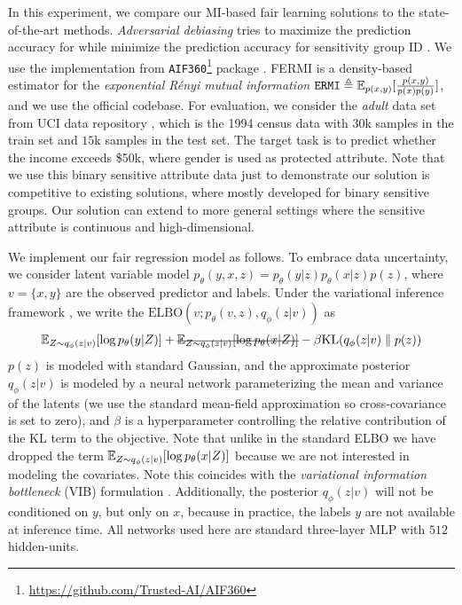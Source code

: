 \documentclass{article}
\theoremstyle{plain}
\theoremstyle{definition}
\theoremstyle{remark}
\newcommand{\ELBO}{\text{ELBO}}
\begin{document}
			In this experiment, we compare our MI-based fair learning solutions to the state-of-the-art methods. {\it Adversarial debiasing} tries to maximize the prediction accuracy for while minimize the prediction accuracy for sensitivity group ID \citep{zhang2018mitigating}. We use the implementation from \texttt{AIF360}\footnote{\url{https://github.com/Trusted-AI/AIF360}} package \citep{aif360-oct-2018}.  FERMI is a density-based estimator for the {\it exponential R\'enyi mutual information} $\texttt{ERMI}\triangleq \mathbb{E}_{p(x,y)}[\frac{p(x,y)}{p(x)p(y)}]$, and we use the official codebase. For evaluation, we consider the {\it adult} data set from UCI data repository \citep{asuncion2007uci}, which is the 1994 census data with $30$k samples in the train set and $15$k samples in the test set. The target task is to predict whether the income exceeds \$50k, where gender is used as protected attribute. Note that we use this binary sensitive attribute data just to demonstrate our solution is competitive to existing solutions, where mostly developed for binary sensitive groups. Our solution can extend to more general settings where the sensitive attribute is continuous and high-dimensional. 
			
			We implement our fair regression model as follows. To embrace data uncertainty, we consider latent variable model $p_\theta(y,x,z) = p_\theta(y|z)p_\theta(x|z)p(z)$, where $v=\{x,y\}$ are the observed predictor and labels.
			Under the variational inference framework \citep{kingma2014auto}, we write the $\ELBO(v;p_\theta(v,z),q_\phi(z|v))$ as
			\begin{align}
					\EE_{Z\sim q_\phi(z|v)}[\log p_\theta(y|Z)] + \text{\st{$\EE_{Z\sim q_\phi(z|v)}[\log p_\theta(x|Z)]$}} - \beta \text{KL}(q_\phi(z|v)\parallel p(z)) \label{eq:elbonew}
				\end{align}
				$p(z)$ is modeled with standard Gaussian, and the approximate posterior $q_\phi(z|v)$ is modeled by a neural network parameterizing the mean and variance of the latents (we use the standard mean-field approximation so cross-covariance is set to zero), and $\beta$ is a hyperparameter controlling the relative contribution of the KL term to the objective.
				Note that unlike in the standard ELBO we have dropped the term $\mathbb{E}_{Z\sim q_\phi(z|v)}[\log p_\theta(x|Z)]$ because we are not interested in modeling the covariates. Note this coincides with the {\it variational information bottleneck} (VIB) formulation \citep{alemi2016deep}. Additionally, the posterior $q_\phi(z|v)$ will not be conditioned on $y$, but only on $x$, because in practice, the labels $y$ are not available at inference time. All networks  used here are standard three-layer MLP with $512$ hidden-units.
				
\end{document}
